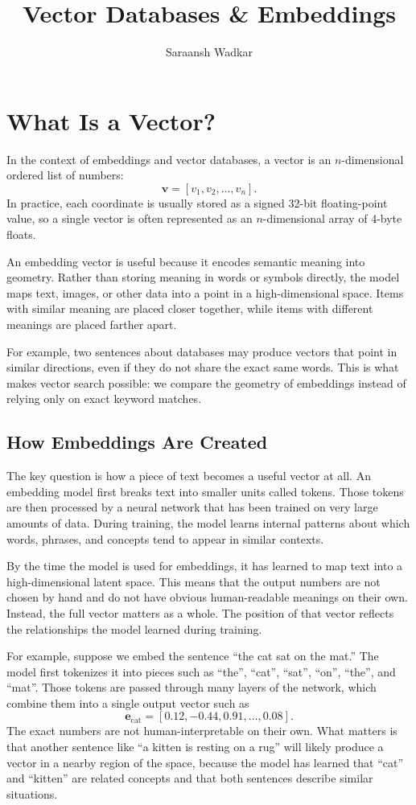 \documentclass[12pt]{article}
\title{Vector Databases \& Embeddings}
\author{Saraansh Wadkar}
\date{}
\begin{document}
\maketitle

\section{What Is a Vector?}

In the context of embeddings and vector databases, a vector is an
$n$-dimensional ordered list of numbers:
\[
\mathbf{v} = [v_1, v_2, \dots, v_n].
\]
In practice, each coordinate is usually stored as a signed 32-bit
floating-point value, so a single vector is often represented as an
$n$-dimensional array of 4-byte floats.

An embedding vector is useful because it encodes semantic meaning into
geometry. Rather than storing meaning in words or symbols directly, the
model maps text, images, or other data into a point in a high-dimensional
space. Items with similar meaning are placed closer together, while items
with different meanings are placed farther apart.

For example, two sentences about databases may produce vectors that point
in similar directions, even if they do not share the exact same words.
This is what makes vector search possible: we compare the geometry of
embeddings instead of relying only on exact keyword matches.

\subsection{How Embeddings Are Created}

The key question is how a piece of text becomes a useful vector at all.
An embedding model first breaks text into smaller units called tokens.
Those tokens are then processed by a neural network that has been trained
on very large amounts of data. During training, the model learns internal
patterns about which words, phrases, and concepts tend to appear in
similar contexts.

By the time the model is used for embeddings, it has learned to map text
into a high-dimensional latent space. This means that the output numbers
are not chosen by hand and do not have obvious human-readable meanings on
their own. Instead, the full vector matters as a whole. The position of
that vector reflects the relationships the model learned during training.

For example, suppose we embed the sentence ``the cat sat on the mat.'' The
model first tokenizes it into pieces such as ``the'', ``cat'', ``sat'',
``on'', ``the'', and ``mat''. Those tokens are passed through many layers
of the network, which combine them into a single output vector such as
\[
\mathbf{e}_{\text{cat}} = [0.12, -0.44, 0.91, \dots, 0.08].
\]
The exact numbers are not human-interpretable on their own. What matters
is that another sentence like ``a kitten is resting on a rug'' will likely
produce a vector in a nearby region of the space, because the model has
learned that ``cat'' and ``kitten'' are related concepts and that both
sentences describe similar situations.
\end{document}
